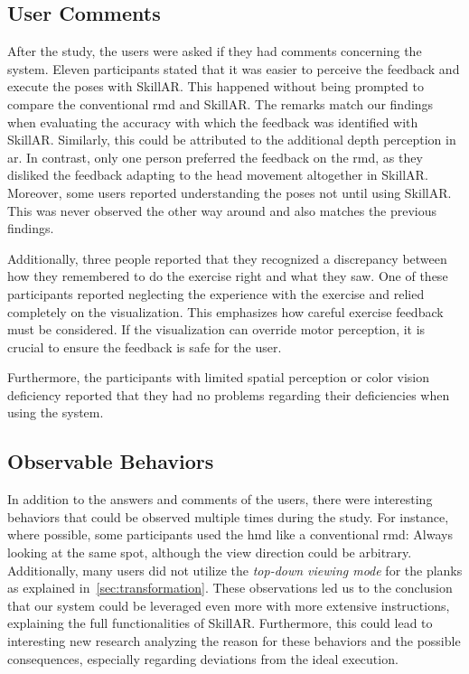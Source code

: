 \subsection{User Comments \label{sec:comments}}
After the study, the users were asked if they had comments concerning the system. Eleven participants stated that it was easier to perceive the feedback and execute the poses with SkillAR. This happened without being prompted to compare the conventional \acrshort{rmd} and SkillAR. The remarks match our findings when evaluating the accuracy with which the feedback was identified with SkillAR. Similarly, this could be attributed to the additional depth perception in \acrshort{ar}. In contrast, only one person preferred the feedback on the \acrshort{rmd}, as they disliked the feedback adapting to the head movement altogether in SkillAR. Moreover, some users reported understanding the poses not until using SkillAR. This was never observed the other way around and also matches the previous findings.

Additionally, three people reported that they recognized a discrepancy between how they remembered to do the exercise right and what they saw. One of these participants reported neglecting the experience with the exercise and relied completely on the visualization. This emphasizes how careful exercise feedback must be considered. If the visualization can override motor perception, it is crucial to ensure the feedback is safe for the user.

Furthermore, the participants with limited spatial perception or color vision deficiency reported that they had no problems regarding their deficiencies when using the system.

\subsection{Observable Behaviors \label{sec:behaviors}}
In addition to the answers and comments of the users, there were interesting behaviors that could be observed multiple times during the study. For instance, where possible, some participants used the \acrshort{hmd} like a conventional \acrshort{rmd}: Always looking at the same spot, although the view direction could be arbitrary. Additionally, many users did not utilize the \emph{top-down viewing mode} for the planks as explained in~\autoref{sec:transformation}. These observations led us to the conclusion that our system could be leveraged even more with more extensive instructions, explaining the full functionalities of SkillAR. Furthermore, this could lead to interesting new research analyzing the reason for these behaviors and the possible consequences, especially regarding deviations from the ideal execution.

